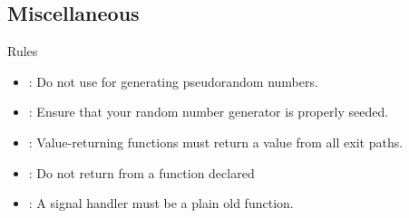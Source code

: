 \subsection{Miscellaneous}

\begin{frame}[t]{Rules}
\begin{itemize}
  \item {}: 
        Do not use  for generating pseudorandom numbers.
  \vfill
  \item {}: 
        Ensure that your random number generator is properly seeded.
  \vfill
  \item {}: 
        Value-returning functions must return a value from all exit paths.
  \vfill
  \item {}: 
        Do not return from a function declared \cppkey{[[noreturn]]}
  \vfill
  \item {}: 
        A signal handler must be a plain old function.
\end{itemize}
\end{frame}
